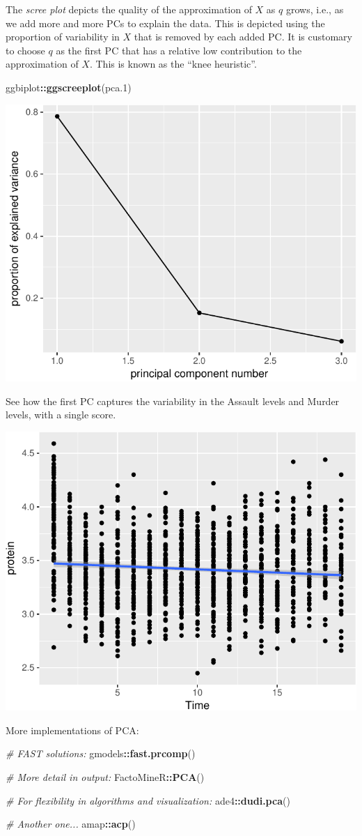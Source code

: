 \documentclass[]{book}
\newenvironment{Shaded}{\begin{snugshade}}{\end{snugshade}}
\newcommand{\KeywordTok}[1]{\textcolor[rgb]{0.13,0.29,0.53}{\textbf{#1}}}
\newcommand{\DecValTok}[1]{\textcolor[rgb]{0.00,0.00,0.81}{#1}}
\newcommand{\CommentTok}[1]{\textcolor[rgb]{0.56,0.35,0.01}{\textit{#1}}}
\newcommand{\OperatorTok}[1]{\textcolor[rgb]{0.81,0.36,0.00}{\textbf{#1}}}
\newcommand{\NormalTok}[1]{#1}
\theoremstyle{definition}
\theoremstyle{definition}
\theoremstyle{definition}
\theoremstyle{remark}
\begin{document}
The \emph{scree plot} depicts the quality of the approximation of \(X\)
as \(q\) grows, i.e., as we add more and more PCs to explain the data.
This is depicted using the proportion of variability in \(X\) that is
removed by each added PC. It is customary to choose \(q\) as the first
PC that has a relative low contribution to the approximation of \(X\).
This is known as the ``knee heuristic''.

\begin{Shaded}
\begin{Highlighting}[]
\NormalTok{ggbiplot}\OperatorTok{::}\KeywordTok{ggscreeplot}\NormalTok{(pca.}\DecValTok{1}\NormalTok{)}
\end{Highlighting}
\end{Shaded}

\includegraphics[width=0.5\linewidth]{Rcourse_files/figure-latex/scree-1}

See how the first PC captures the variability in the Assault levels and
Murder levels, with a single score.

\includegraphics[width=0.5\linewidth]{Rcourse_files/figure-latex/unnamed-chunk-233-1}

More implementations of PCA:

\begin{Shaded}
\begin{Highlighting}[]
\CommentTok{# FAST solutions:}
\NormalTok{gmodels}\OperatorTok{::}\KeywordTok{fast.prcomp}\NormalTok{()}

\CommentTok{# More detail in output:}
\NormalTok{FactoMineR}\OperatorTok{::}\KeywordTok{PCA}\NormalTok{()}

\CommentTok{# For flexibility in algorithms and visualization:}
\NormalTok{ade4}\OperatorTok{::}\KeywordTok{dudi.pca}\NormalTok{()}

\CommentTok{# Another one...}
\NormalTok{amap}\OperatorTok{::}\KeywordTok{acp}\NormalTok{()}
\end{Highlighting}
\end{Shaded}
\end{document}

